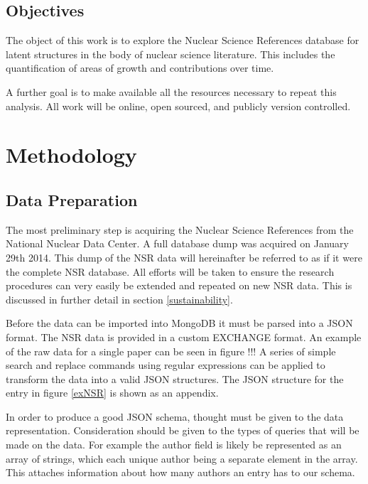 \documentclass[12pt]{article}
\begin{document}
\begin{doublespacing}
\subsection{Objectives}
The object of this work is to explore the Nuclear Science References database for latent structures in the body of nuclear science literature.
This includes the quantification of areas of growth and contributions over time.

A further goal is to make available all the resources necessary to repeat this analysis.
All work will be online, open sourced, and publicly version controlled. 

\pagebreak
\section{Methodology}

\subsection{Data Preparation}
The most preliminary step is acquiring the Nuclear Science References from the National Nuclear Data Center.
A full database dump was acquired on January 29th 2014.
This dump of the NSR data will hereinafter be referred to as if it were the complete NSR database.
All efforts will be taken to ensure the research procedures can very easily be extended and repeated on new NSR data.
This is discussed in further detail in section \ref{sustainability}.

Before the data can be imported into MongoDB it must be parsed into a JSON format.
The NSR data is provided in a custom EXCHANGE format. \citep{winchell2007nuclear}
An example of the raw data for a single paper can be seen in figure !!! %
A series of simple search and replace commands using regular expressions can be applied to transform the data into a valid JSON structures.
The JSON structure for the entry in figure \ref{exNSR} is shown as an appendix. %

In order to produce a good JSON schema, thought must be given to the data representation.
Consideration should be given to the types of queries that will be made on the data.
For example the author field is likely be represented as an array of strings, which each unique author being a separate element in the array.
This attaches information about how many authors an entry has to our schema.


\end{doublespacing}
\end{document}
